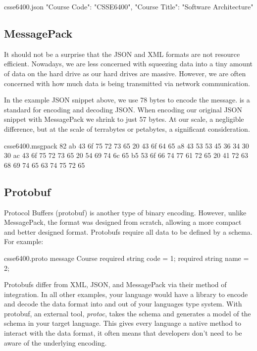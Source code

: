 \documentclass{csse4400}
\begin{document}
\begin{code}[language=json]{csse6400.json}
{
    "Course Code": "CSSE6400",
    "Course Title": "Software Architecture"
}
\end{code}

\subsection{MessagePack}
It should not be a surprise that the JSON and XML formats are not resource efficient.
Nowadays, we are less concerned with squeezing data into a tiny amount of data on the hard drive as our hard drives are massive.
However, we are often concerned with how much data is being transmitted via network communication.

In the example JSON snippet above, we use 78 bytes to encode the message.
 is a standard for encoding and decoding JSON.
When encoding our original JSON snippet with MessagePack we shrink to just 57 bytes.
At our scale, a negligible difference,
but at the scale of terrabytes or petabytes,
a significant consideration.

\begin{code}[]{csse6400.msgpack}
82 ab 43 6f 75 72 73 65 20 43 6f 64 65 a8 43 53 53 45 36 34 30 30 ac 43 6f 75 72 73 65 20 54 69 74 6c 65 b5 53 6f 66 74 77 61 72 65 20 41 72 63 68 69 74 65 63 74 75 72 65
\end{code}


\subsection{Protobuf}
Protocol Buffers (protobuf) is another type of binary encoding.
However, unlike MessagePack, the format was designed from scratch,
allowing a more compact and better designed format.
Protobufs require all data to be defined by a schema.
For example:

\begin{code}[language=protobuf]{csse6400.proto}
message Course {
    required string code = 1;
    required string name = 2;
}
\end{code}

Protobufs differ from XML, JSON, and MessagePack via their method of integration.
In all other examples,
your language would have a library to encode and decode the data format into and out of your languages type system.
With protobuf, an external tool, \textsl{protoc},
takes the schema and generates a model of the schema in your target language.
This gives every language a native method to interact with the data format,
it often means that developers don't need to be aware of the underlying encoding.
\end{document}
